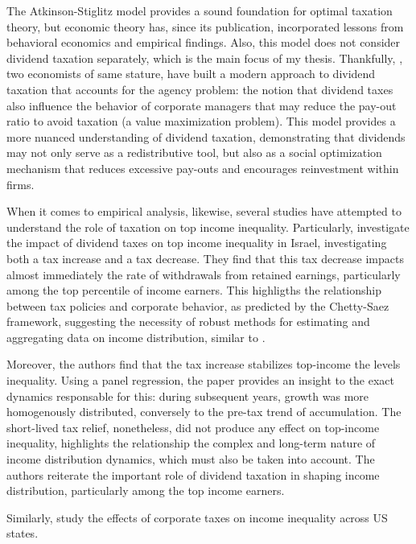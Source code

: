 \documentclass[a4paper, 12pt]{article}
\begin{document}
\par
The Atkinson-Stiglitz model provides a sound foundation for optimal taxation theory, but economic theory has, since its publication, incorporated lessons from behavioral economics and empirical findings. 
Also, this model does not consider dividend taxation separately, which is the main focus of my thesis.
Thankfully, \cite{chetty_agency_2007}, two economists of same stature, have built a modern approach to dividend taxation that accounts for the agency problem: the notion that dividend taxes also influence the behavior of corporate managers that may reduce the pay-out ratio to avoid taxation (a value maximization problem).
This model provides a more nuanced understanding of dividend taxation, demonstrating that dividends may not only serve as a redistributive tool, but also as a social optimization mechanism that reduces excessive pay-outs and encourages reinvestment within firms.
\pagebreak
\par
When it comes to empirical analysis, likewise, several studies have attempted to understand the role of taxation on top income inequality. 
Particularly, \cite{berman2024capital} investigate the impact of dividend taxes on top income inequality in Israel, investigating both a tax increase and a tax decrease. 
They find that this tax decrease impacts almost immediately the rate of withdrawals from retained earnings, particularly among the top percentile of income earners.
This highligths the relationship between tax policies and corporate behavior, as predicted by the Chetty-Saez framework, suggesting the necessity of robust methods for estimating and aggregating data on income distribution, similar to \cite{piketty_distributional_nodate}.
\par
Moreover, the authors find that the tax increase stabilizes top-income the levels inequality.
Using a panel regression, the paper provides an insight to the exact dynamics responsable for this: during subsequent years, growth was more homogenously distributed, conversely to the pre-tax trend of accumulation. 
The short-lived tax relief, nonetheless, did not produce any effect on top-income inequality, highlights the relationship the complex and long-term nature of income distribution dynamics, which must also be taken into account.
The authors reiterate the important role of dividend taxation in shaping income distribution, particularly among the top income earners.
\par
Similarly, \cite{nallareddy2021corporate} study the effects of corporate taxes on income inequality across US states.
\end{document}
